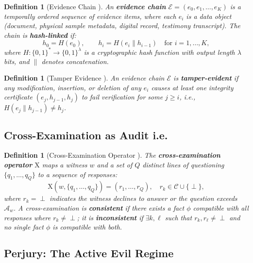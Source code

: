 \documentclass[11pt,a4paper]{article}
\newtheorem{definition}[theorem]{Definition}
\theoremstyle{definition}
\newcommand{\fact}{\phi}                        %
\newcommand{\claimSpace}{\mathcal{C}}           %
\newcommand{\evidenceChain}{\mathcal{E}}        %
\newcommand{\hashFunc}{H}                       %
\newcommand{\crossexam}{\mathrm{X}}             %
\begin{document}
\begin{definition}[Evidence Chain ]
\label{def:evidencechain}
An \textbf{evidence chain} $\evidenceChain = (e_0, e_1, \ldots, e_K)$ is a temporally ordered sequence of evidence items, where each $e_i$ is a data object (document, physical sample metadata, digital record, testimony transcript). The chain is \textbf{hash-linked} if:
\begin{equation}
    h_0 = \hashFunc(e_0), \qquad h_i = \hashFunc(e_i \| h_{i-1}) \quad \text{for } i = 1, \ldots, K,
    \label{eq:hashchain}
\end{equation}
where $\hashFunc: \{0, 1\}^* \to \{0, 1\}^\lambda$ is a cryptographic hash function with output length $\lambda$ bits, and $\|$ denotes concatenation.
\end{definition}

\begin{definition}[Tamper Evidence ]
\label{def:tamper}
An evidence chain $\evidenceChain$ is \textbf{tamper-evident} if any modification, insertion, or deletion of any $e_i$ causes at least one integrity certificate $(e_j, h_{j-1}, h_j)$ to fail verification for some $j \geq i$, i.e., $\hashFunc(e_j \| h_{j-1}) \neq h_j$.
\end{definition}

\subsection{Cross-Examination as Audit i.e.}

\begin{definition}[Cross-Examination Operator ]
\label{def:crossexam}
The \textbf{cross-examination operator} $\crossexam$ maps a witness $w$ and a set of $Q$ distinct lines of questioning $\{q_1, \ldots, q_Q\}$ to a sequence of responses:
\begin{equation}
    \crossexam(w, \{q_1, \ldots, q_Q\}) = (r_1, \ldots, r_Q), \quad r_k \in \claimSpace \cup \{\perp\},
    \label{eq:crossexam}
\end{equation}
where $r_k = \perp$ indicates the witness declines to answer or the question exceeds $\mathcal{A}_w$. A cross-examination is \textbf{consistent} if there exists a fact $\fact$ compatible with all responses where $r_k \neq \perp$; it is \textbf{inconsistent} if $\exists k, \ell$ such that $r_k, r_\ell \neq \perp$ and no single fact $\fact$ is compatible with both.
\end{definition}

\subsection{Perjury: The Active Evil Regime }
\end{document}
